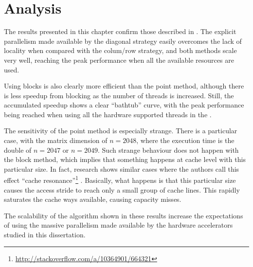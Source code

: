 \documentclass[../thesis]{subfiles}
\begin{document}
	\section{Analysis}
	\label{sec:multicore:analysis}

	The results presented in this chapter confirm those described in \cite{Deadman:Higham:Ralha:2013}. The explicit parallelism made available by the diagonal strategy easily overcomes the lack of locality when compared with the colum/row strategy, and both methods scale very well, reaching the peak performance when all the available resources are used.

	Using blocks is also clearly more efficient than the point method, although there is less speedup from blocking as the number of threads is increased. Still, the accumulated speedup shows a clear ``bathtub'' curve, with the peak performance being reached when using all the hardware supported threads in the \cpu.

	The sensitivity of the point method is especially strange. There is a particular case, with the matrix dimension of $n = 2048$, where the execution time is the double of $n = 2047$ or $n = 2049$. Such strange behaviour does not happen with the block method, which implies that something happens at cache level with this particular size. In fact, research shows similar cases where the authors call this effect ``cache resonance''\footnote{\url{http://stackoverflow.com/a/10364901/664321}} \cite{MathWorks:LAPACK}. Basically, what happens is that this particular size causes the access stride to reach only a small group of cache lines. This rapidly saturates the cache ways available, causing capacity misses.

	The scalability of the algorithm shown in these results increase the expectations of using the massive parallelism made available by the hardware accelerators studied in this dissertation.
\end{document}
